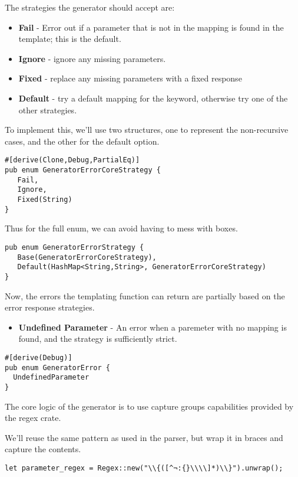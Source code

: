 \documentclass[11pt]{article}
\begin{document}
The strategies the generator should accept are:
\begin{itemize}
\item \textbf{Fail} - Error out if a parameter that is not in the mapping is found in the template; this is the default.
\item \textbf{Ignore} - ignore any missing parameters.
\item \textbf{Fixed} - replace any missing parameters with a fixed response
\item \textbf{Default} - try a default mapping for the keyword, otherwise try one of the other strategies.
\end{itemize}
To implement this, we'll use two structures, one to represent the non-recursive cases, and the other for the default option.
\begin{verbatim}
#[derive(Clone,Debug,PartialEq)]
pub enum GeneratorErrorCoreStrategy {
   Fail,
   Ignore,
   Fixed(String)
}
\end{verbatim}

Thus for the full enum, we can avoid having to mess with boxes.
\begin{verbatim}
pub enum GeneratorErrorStrategy {
   Base(GeneratorErrorCoreStrategy),
   Default(HashMap<String,String>, GeneratorErrorCoreStrategy)
}
\end{verbatim}

Now, the errors the templating function can return are partially based on the error response strategies.
\begin{itemize}
\item \textbf{Undefined Parameter} - An error when a paremeter with no mapping is found, and the strategy is sufficiently strict.
\end{itemize}
\begin{verbatim}
#[derive(Debug)]
pub enum GeneratorError {
  UndefinedParameter
}
\end{verbatim}


The core logic of the generator is to use capture groups capabilities provided by the regex crate.

We'll reuse the same pattern as used in the parser, but wrap it in braces and capture the contents.
\begin{verbatim}
let parameter_regex = Regex::new("\\{([^¬:{}\\\\]*)\\}").unwrap();
\end{verbatim}
\end{document}
